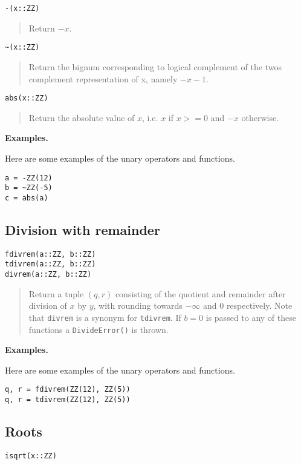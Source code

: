 \documentclass[a4paper,10pt]{article}
\newcommand{\code}{\lstinline}
\newcommand{\desc}[1]{\vspace{-3mm}\begin{quote}#1\end{quote}}
\begin{document}
{{{\begin{lstlisting}
-(x::ZZ)
\end{lstlisting}

\desc{Return $-x$.}

\begin{lstlisting}
~(x::ZZ)
\end{lstlisting}

\desc{Return the bignum corresponding to logical complement of the twos 
complement representation of x, namely $-x - 1$.}

\begin{lstlisting}
abs(x::ZZ)
\end{lstlisting}

\desc{Return the absolute value of $x$, i.e. $x$ if $x >= 0$ and $-x$ otherwise.}

\textbf{Examples.}

Here are some examples of the unary operators and functions.

\begin{lstlisting}
a = -ZZ(12)
b = ~ZZ(-5)
c = abs(a)
\end{lstlisting}

\subsection{Division with remainder}

\begin{lstlisting}
fdivrem(a::ZZ, b::ZZ)
tdivrem(a::ZZ, b::ZZ)
divrem(a::ZZ, b::ZZ)
\end{lstlisting}

\desc{Return a tuple $(q, r)$ consisting of the quotient and remainder after 
division of $x$ by $y$, with rounding towards $-\infty$ and $0$ respectively. Note 
that \code{divrem} is a synonym for \code{tdivrem}. If $b = 0$ is passed to any
of these functions a \code{DivideError()} is thrown.}

\textbf{Examples.}

Here are some examples of the unary operators and functions.

\begin{lstlisting}
q, r = fdivrem(ZZ(12), ZZ(5))
q, r = tdivrem(ZZ(12), ZZ(5))
\end{lstlisting}

\subsection{Roots}

\begin{lstlisting}
isqrt(x::ZZ)
\end{lstlisting}

}}}
\end{document}
